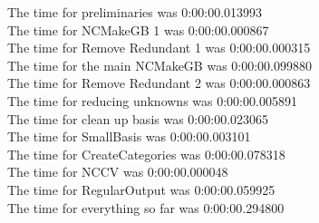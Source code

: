 \documentclass[rep10,leqno]{report}
\begin{document}
\noindent
The time for preliminaries was 0:00:00.013993\\
The time for NCMakeGB 1 was 0:00:00.000867\\
The time for Remove Redundant 1 was 0:00:00.000315\\
The time for the main NCMakeGB was 0:00:00.099880\\
The time for Remove Redundant 2 was 0:00:00.000863\\
The time for reducing unknowns was 0:00:00.005891\\
The time for clean up basis was 0:00:00.023065\\
The time for SmallBasis was 0:00:00.003101\\
The time for CreateCategories was 0:00:00.078318\\
The time for NCCV was 0:00:00.000048\\
The time for RegularOutput was 0:00:00.059925\\
The time for everything so far was 0:00:00.294800\\
\end{document}
